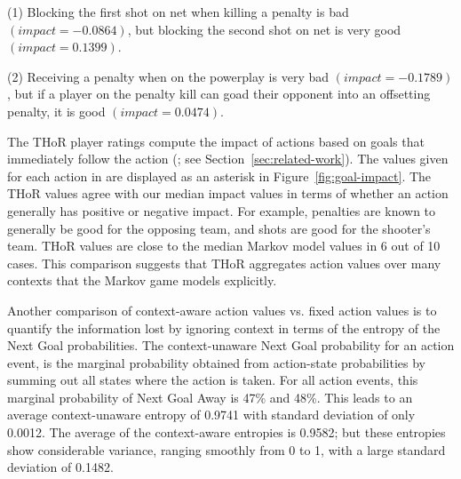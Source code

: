 \documentclass[]{article}
\begin{document}
 (1) Blocking the first shot on net when killing a penalty is bad $(impact=-0.0864)$, but blocking the second shot on net is very good $(impact=0.1399)$.

 (2) Receiving a penalty when on the powerplay is very bad $(impact=-0.1789)$, but if a player on the penalty kill can goad their opponent into an offsetting penalty, it is good $(impact=0.0474)$.

The THoR player ratings compute the impact of actions based on goals that immediately follow the action (\citep{Lock2009,Schuckers2011}; see Section~\ref{sec:related-work}). The values given for each action in \citep{Lock2009} are displayed as an asterisk in Figure~\ref{fig:goal-impact}.
%
The THoR values
agree with our median impact values in terms of whether an action generally has positive or negative impact. For example, penalties are known to generally be good for the opposing team, and shots are good for the shooter's team. THoR values are close to the median Markov model values in 6 out of 10 cases.
This comparison suggests that THoR aggregates action values over many contexts that the Markov game models explicitly.

Another comparison of context-aware action values vs. fixed action values is to quantify the information lost by ignoring context in terms of the entropy of the Next Goal probabilities. 
%
The context-unaware Next Goal probability for an action event, is the marginal probability obtained from action-state probabilities by summing out all states where the action is taken. For all action events, this marginal probability of Next Goal Away is 47\% and 48\%.  This leads to an average context-unaware entropy of 0.9741 with standard deviation of only 0.0012. The average of the context-aware entropies is 0.9582; but  these entropies show considerable variance, ranging smoothly from 0 to 1, with a large standard deviation of 0.1482.
\end{document}
